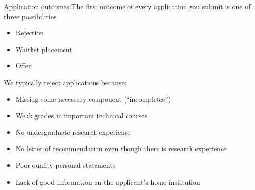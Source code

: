 \begin{frame}[fragile]{Application outcomes}
The first outcome of every application you submit is one of three possibilities
\begin{itemize}
    \item Rejection
    \item Waitlist placement
    \item Offer
\end{itemize}

We typically reject applications because:
\begin{itemize}
    \item Missing some necessary component (``incompletes'')
    \item Weak grades in important technical courses
    \item No undergraduate research experience
    \item No letter of recommendation even though there is research experience
    \item Poor quality personal statements
    \item Lack of good information on the applicant's home institution
\end{itemize}
\end{frame}

